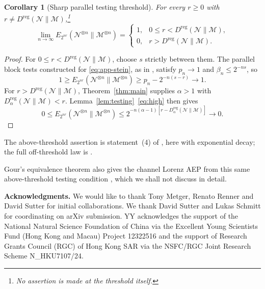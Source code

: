 \documentclass[11pt,letterpaper]{article}
\numberwithin{equation}{section}
\newtheorem{corollary}[theorem]{Corollary}
\newcommand{\N}{\mathcal N}
\newcommand{\M}{\mathcal M}
\newcommand{\reg}{\mathrm{reg}}
\newcommand{\Dt}{D}
\begin{document}
\begin{corollary}[Sharp parallel testing threshold]\label{cor:sharp-testing}
For every $r\ge0$ with $r\ne D^{\reg}(\N\|\M)$,\footnote{No assertion is made at the threshold itself.}
\begin{equation}\label{eq:app-sharp}
 \lim_{n\to\infty}E_{2^{nr}}(\N^{\otimes n}\|\M^{\otimes n})
 =\begin{cases}
   1,&0\le r<D^{\reg}(\N\|\M),\\
   0,&r>D^{\reg}(\N\|\M).
  \end{cases}
\end{equation}
\end{corollary}

\begin{proof}
For $0\le r<D^{\reg}(\N\|\M)$, choose $s$ strictly between them. The parallel block tests constructed for \eqref{eq:app-stein}, as in \cite[Lemma 12]{Gour}, satisfy $p_n\to1$ and $\beta_n\le2^{-ns}$, so
\[
 1\ge E_{2^{nr}}(\N^{\otimes n}\|\M^{\otimes n})
 \ge p_n-2^{-n(s-r)}\longrightarrow1.
\]
For $r>D^{\reg}(\N\|\M)$, Theorem~\ref{thm:main} supplies $\alpha>1$ with $\Dt_\alpha^{\reg}(\N\|\M)<r$. Lemma~\ref{lem:testing}~\eqref{eq:high} then gives
\[
 0\le E_{2^{nr}}(\N^{\otimes n}\|\M^{\otimes n})
 \le2^{-n(\alpha-1)[r-\Dt_\alpha^{\reg}(\N\|\M)]}\longrightarrow0.
\]
\end{proof}

The above-threshold assertion is statement~(4) of \cite[Theorem 14]{Gour}, here with exponential decay; the full off-threshold law is \cite[Eq.~(209)]{Gour}.

Gour's equivalence theorem also gives the channel Lorenz AEP from this same above-threshold testing condition \cite[Theorem 14, (4) implies (2)]{Gour}, which we shall not discuss in detail.\par\medskip

\noindent\textbf{Acknowledgments.}
We would like to thank Tony Metger, Renato Renner and David Sutter for initial collaborations. We thank David Sutter and Lukas Schmitt for coordinating on arXiv submission. YY acknowledges the support of the National Natural Science Foundation of China via the Excellent Young Scientists Fund (Hong Kong and Macau) Project 12322516 and the support of Research Grants Council (RGC) of Hong Kong SAR via the NSFC/RGC Joint Research Scheme N\_HKU7107/24.
\end{document}
